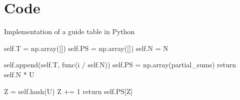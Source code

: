 \newpage %
\section{Code}

\begin{algorithm}
    \caption{Implementation of a guide table in Python}
    \begin{algorithmic}
        \Statex {}
            \State self.T = np.array([])
            \State self.PS = np.array([])
            \State self.N = N
        \EndFunction

        \Statex {}
                \State self.append(self.T, func(i / self.N))
            \EndFor
        \EndFunction
        \State
            \State self.PS = np.array(partial\_sums)
        \EndFunction
        \State
            \State return self.N * U
        \EndFunction
        
            \State Z = self.hash(U)
                \State Z += 1
            \EndWhile
            \State return self.PS[Z]
        \EndFunction
    \end{algorithmic}
\end{algorithm}
